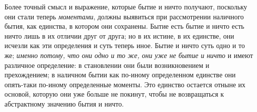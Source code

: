 Более точный смысл и выражение, которые бытие и
ничто получают, поскольку они стали теперь \emph{моментами},
должны выявиться при рассмотрении наличного бытия,
как единства, в котором они сохранены. Бытие есть бытие
и ничто есть ничто лишь в их отличии друг от друга;
но в их истине, в их единстве, они исчезли как эти
определения и суть теперь иное. Бытие и ничто суть одно
и то же; \emph{именно потому, что они одно и то же, они
уже не бытие и ничто} и имеют различное определение:
в становлении они были возникновением и прехождением;
в наличном бытии как по-иному определенном единстве
они опять-таки по-иному определенные моменты.
Это единство остается отныне их основой, которую они
уже больше не покинут, чтобы не возвращаться к абстрактному
значению бытия и ничто.



